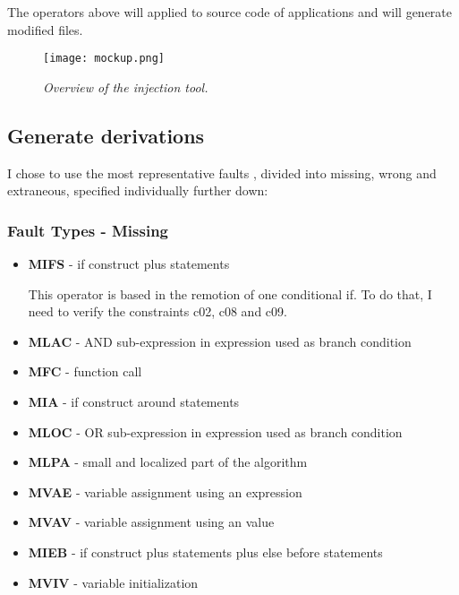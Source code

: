 The operators above will applied to source code of applications and will generate modified files.

\begin{figure}[!ht]
\begin{center}
\texttt{[image: mockup.png]}
\caption{\small \sl Overview of the injection tool.\label{fig:mockup}}
\end{center}
\end{figure}

\subsection{Generate derivations}

I chose to use the most representative faults \cite{duraes2006emulation}, divided into missing, wrong and extraneous, specified individually further down:


\subsubsection{Fault Types - Missing}
\begin{itemize}
	\item \textbf{MIFS} - if construct plus statements

	This operator is based in the remotion of one conditional if. To do that, I need to verify the constraints c02, c08 and c09.
	\item \textbf{MLAC} - AND sub-expression in expression used as branch condition
	\item \textbf{MFC}  - function call
	\item \textbf{MIA}  - if construct around statements
	\item \textbf{MLOC} - OR sub-expression in expression used as branch condition
	\item \textbf{MLPA} - small and localized part of the algorithm
	\item \textbf{MVAE} - variable assignment using an expression
	\item \textbf{MVAV} - variable assignment using an value
	\item \textbf{MIEB} - if construct plus statements plus else before statements
	\item \textbf{MVIV} - variable initialization
\end{itemize}

